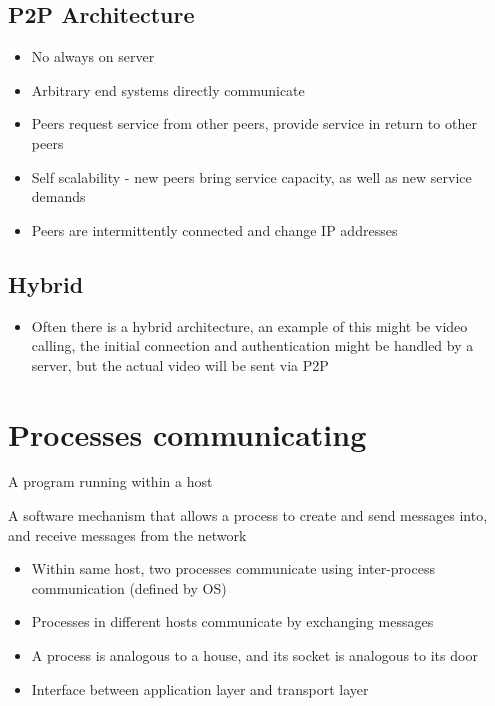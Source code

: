 \documentclass{article}[18pt]
\begin{document}
\subsection{P2P Architecture}
\begin{itemize}
	\item No always on server
	\item Arbitrary end systems directly communicate
	\item Peers request service from other peers, provide service in return to other peers
	\item Self scalability - new peers bring service capacity, as well as new service demands
	\item Peers are intermittently connected and change IP addresses
\end{itemize}
\subsection{Hybrid}
\begin{itemize}
	\item Often there is a hybrid architecture, an example of this might be video calling, the initial connection and authentication might be handled by a server, but the actual video will be sent via P2P
\end{itemize}
\section{Processes communicating}
\begin{defin}[Process]
A program running within a host
\end{defin}
\begin{defin}[Socket]
A software mechanism that allows a process to create and send messages into, and receive messages from the network
\end{defin}
\begin{itemize}
	\item Within same host, two processes communicate using inter-process communication (defined by OS)
	\item Processes in different hosts communicate by exchanging messages
	\item A process is analogous to a house, and its socket is analogous to its door
	\item Interface between application layer and transport layer
\end{itemize}
\end{document}
